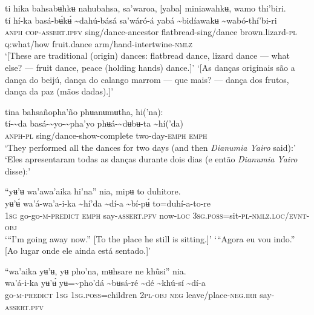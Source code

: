 \documentclass[output=paper,
modfonts,nonflat
]{langsci/langscibook}
\begin{document}
 
\ea ti hika bahsabʉhkʉ nahubahsa, sa'waroa, [yaba] miniawahkʉ, wamo thi’biri.\\[.3em]
\gll tí	hí-ka	basá-bʉ́kʉ́	{\textasciitilde}dahú-básá	sa'wáró-á yabá	{\textasciitilde}bidíawakʉ	{\textasciitilde}wabó-thí'bi-ri\\
     \textsc{anph}	\textsc{cop-assert.ipfv}	sing/dance-ancestor	flatbread-sing/dance	brown.lizard\textsc{-pl} \textsc{q}:what/how	fruit.dance	arm/hand-intertwine\textsc{-nmlz}\\
\glt ‘[These are traditional (origin) dances: flatbread dance, lizard dance — what else? — fruit dance, peace (holding hands) dance.]’
\glt ‘[As danças originais são a dança do beijú, dança do calango marrom — que mais? — dança dos frutos, dança da paz (mãos dadas).]’
\z 

\ea tina bahsañopha'ño phʉanʉmʉtha, hi('na): \\[.3em]
\gll tí-{\textasciitilde}da	basá-{\textasciitilde}yo-{\textasciitilde}pha'yo	phʉá-{\textasciitilde}dʉbʉ-ta	{\textasciitilde}hí('da) \\
     \textsc{anph-pl}	sing/dance-show-complete	two-day-\textsc{emph}	\textsc{emph}\\
\glt ‘They performed all the dances for two days (and then \textit{Dianumia Yairo} said):'
\glt ‘Eles apresentaram todas as danças durante dois dias (e então \textit{Dianumia Yairo} disse):'
\z 

\ea “yʉ’ʉ wa'awa'aika hi'na” nia, mipʉ to duhitore. \\[.3em]
\gll yʉ’ʉ́	wa'á-wa'a-i-ka	{\textasciitilde}hí'da	{\textasciitilde}dí-a	{\textasciitilde}bí-pʉ́	to=duhí{\footnotemark}-a-to-re \\
     1\textsc{sg}	go-go-\textsc{m-predict}	\textsc{emph}	say-\textsc{assert.pfv}	now\textsc{-loc}	3\textsc{sg.poss}=sit\textsc{-pl-nmlz.loc/evnt-obj}\\
\glt ‘“I'm going away now.” [To the place he still is sitting.]’
\glt ‘“Agora eu vou indo.” [Ao lugar onde ele ainda está sentado.]’
\z

\newpage 
\ea “wa'aika yʉ’ʉ, yʉ pho'na, mʉhsare ne khũsi” nia. \\[.3em]
\gll wa'á-i-ka	yʉ’ʉ́	yʉ={\textasciitilde}pho'dá	{\textasciitilde}bʉsá-ré	{\textasciitilde}dé	{\textasciitilde}khú-sí	{\textasciitilde}dí-a \\
     go-\textsc{m-predict}	1\textsc{sg}	1\textsc{sg.poss}=children	2\textsc{pl-obj}	\textsc{neg}	leave/place\textsc{-neg.irr}	say-\textsc{assert.pfv}\\
      
\end{document}
